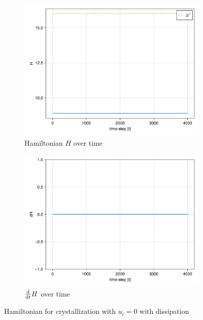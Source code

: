 \begin{itemize}
\begin{figure}[H]
    \centering
    \begin{subfigure}{0.49\textwidth}
        \centering
        \includegraphics[width=\linewidth]{figures/ch5_basic/H_nodisp.png}
        \caption{Hamiltonian $H$ over time}
        \label{plot:nodisp_h}
    \end{subfigure}
    \begin{subfigure}{.49\textwidth}
        \centering
        \includegraphics[width=\linewidth]{figures/ch5_basic/dH_nodisp.png}
        \caption{$\frac{\mathrm d}{\mathrm d t} H$ over time}
        \label{plot:nodisp_dh}
    \end{subfigure}
    \caption{Hamiltonian for crystallization with $u_i =0$ with dissipation}
    \label{plot:nodisp_hamiltonian}
\end{figure}


\end{itemize}
